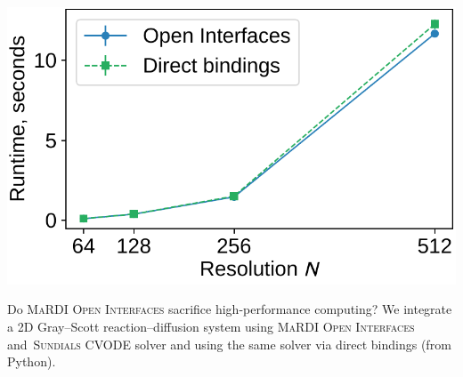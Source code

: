 \documentclass[a0paper, twocolumn, csc, english, final]{mpi2015_poster}
\newcommand{\OIF}{\textsc{MaRDI Open Interfaces}\xspace}
\begin{document}
\begin{poster}
\begin{pcolumn}
\begin{pbox}
      \begin{minipage}{\dimexpr0.58\columnwidth - 2\tabcolsep}
        \centering
      \includegraphics[width=0.8\columnwidth]{ivp_cvode_gs_performance}
      \end{minipage}\hfill%
      \begin{minipage}{\dimexpr0.42\columnwidth - 2\tabcolsep}
        Do \OIF{} sacrifice high-performance computing? We integrate
        a 2D Gray--Scott reaction--diffusion system using \OIF{}
        and~\textsc{Sundials CVODE} solver and using the same solver
        via direct bindings (from Python).


\end{minipage}
\end{pbox}
\end{pcolumn}
\end{poster}
\end{document}
